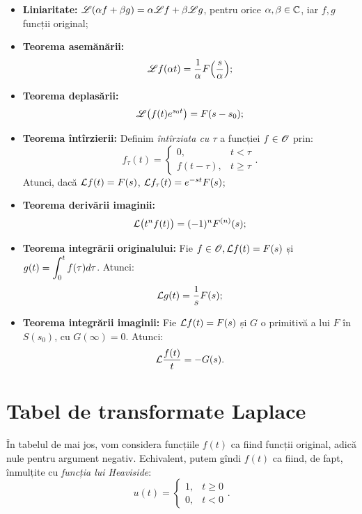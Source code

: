 \begin{itemize}
\item \textbf{Liniaritate:} $ \mathscr{L}(\alpha f + \beta g) = \alpha \mathscr{L} f + \beta \mathscr{L} g $,
  pentru orice $ \alpha, \beta \in \mathbb{C} $, iar $ f, g $ funcții original;
\item \textbf{Teorema asemănării:}
  \[
    \mathscr{L} f(\alpha t) = \dfrac{1}{\alpha} F \Big( \dfrac{s}{\alpha} \Big);
  \]
\item \textbf{Teorema deplasării:}
  \[
    \mathscr{L} \big( f(t) e^{s_0t} \big) = F(s - s_0);
  \]
\item \textbf{Teorema întîrzierii:} Definim \emph{întîrziata cu $ \tau $ } a funcției
  $ f \in \mathscr{O} $ prin:
  \[
    f_\tau(t) =
    \begin{cases}
      0, & t < \tau \\
      f(t - \tau), & t \geq \tau
    \end{cases}.
  \]
  Atunci, dacă $ \mathcal{L} f(t) = F(s) $, $ \mathcal{L} f_\tau (t) = e^{-st} F(s) $;
\item \textbf{Teorema derivării imaginii:}
  \[
    \mathcal{L} \big( t^n f(t) \big) = (-1)^n F^{(n)} (s);
  \]
\item \textbf{Teorema integrării originalului:} Fie $ f \in \mathscr{O}, \mathcal{L} f(t) = F(s) $ și
  $ g(t) = \displaystyle\int_0^t f(\tau) d\tau $. Atunci:
  \[
    \mathcal{L} g(t) = \dfrac{1}{s} F(s);
  \]
\item \textbf{Teorema integrării imaginii:} Fie $ \mathcal{L} f(t) = F(s) $ și $ G $ o primitivă a
  lui $ F $ în $ S(s_0) $, cu $ G(\infty) = 0 $. Atunci:
  \[
    \mathcal{L} \dfrac{f(t)}{t} = -G(s).
  \]
\end{itemize}

\newpage
\section{Tabel de transformate Laplace}

\indent\indent În tabelul de mai jos, vom considera funcțiile $ f(t) $ ca fiind funcții original,
adică nule pentru argument negativ. Echivalent, putem gîndi $ f(t) $ ca fiind, de fapt,
înmulțite cu \emph{funcția lui Heaviside}:
\[
  u(t) =
  \begin{cases}
    1, & t \geq 0 \\
    0, & t < 0 
  \end{cases}.
\]

